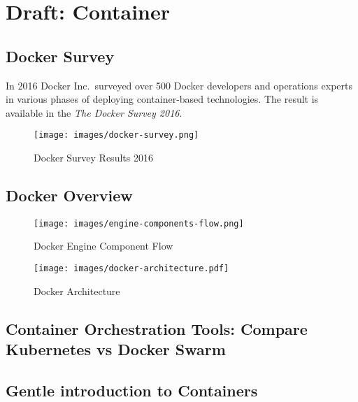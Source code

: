 
\chapter{Draft: Container}

\FILENAME

\section{Docker Survey}

In 2016 Docker Inc.\ surveyed over 500 Docker developers and operations
experts in various phases of deploying container-based
technologies. The result is available in the \textit{The Docker Survey
  2016}.


\begin{figure}[htb]
\centering
\texttt{[image: images/docker-survey.png]}
\caption{Docker Survey Results 2016
}
\end{figure}


\section{Docker Overview}



\begin{figure}[htb]
\centering
\texttt{[image: images/engine-components-flow.png]}
\caption{ Docker Engine Component Flow }
\end{figure}

\begin{figure}[htb]
\centering
\texttt{[image: images/docker-architecture.pdf]}
\caption{ Docker Architecture }
\end{figure}



\section{Container Orchestration Tools: Compare Kubernetes vs Docker Swarm}


\section{Gentle introduction to Containers}


